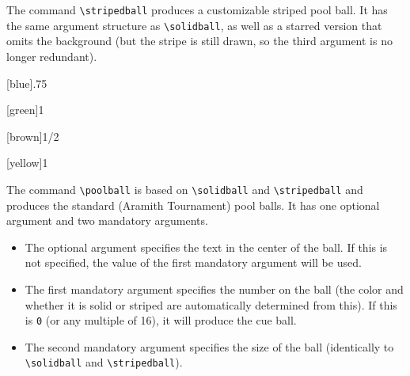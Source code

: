 The command \verb!\stripedball! produces a customizable striped pool ball. It has the same argument structure as \verb!\solidball!, as well as a starred version that omits the background (but the stripe is still drawn, so the third argument is no longer redundant).

\begin{tcolorbox}[blanker,sidebyside,before skip=10pt,after skip=10pt]
\begin{verbbox}[righthand width=1.3cm]
\end{verbbox}
\begin{verbbox}[righthand width=1.3cm]
\end{verbbox}
\begin{verbbox}[righthand width=1.3cm]
[blue]{.75}
\end{verbbox}
\begin{verbbox}[righthand width=1.3cm]
[green]{1}
\end{verbbox}
\tcblower %
\begin{verbbox}[righthand width=1.3cm]
\end{verbbox}
\begin{verbbox}[righthand width=1.3cm]
[brown]{1/2}
\end{verbbox}
\begin{verbbox}[righthand width=1.3cm]
\end{verbbox}
\begin{verbbox}[righthand width=1.3cm]
[yellow]{1}
\end{verbbox}
\end{tcolorbox}

\newpage %

The command \verb!\poolball! is based on \verb!\solidball! and \verb!\stripedball! and produces the standard (Aramith Tournament) pool balls. It has one optional argument and two mandatory arguments.
\begin{itemize}
    \item The optional argument specifies the text in the center of the ball. If this is not specified, the value of the first mandatory argument will be used.
    \item The first mandatory argument specifies the number on the ball (the color and whether it is solid or striped are automatically determined from this). If this is \texttt{0} (or any multiple of 16), it will produce the cue ball.
    \item The second mandatory argument specifies the size of the ball (identically to \verb!\solidball! and \verb!\stripedball!).
\end{itemize}

